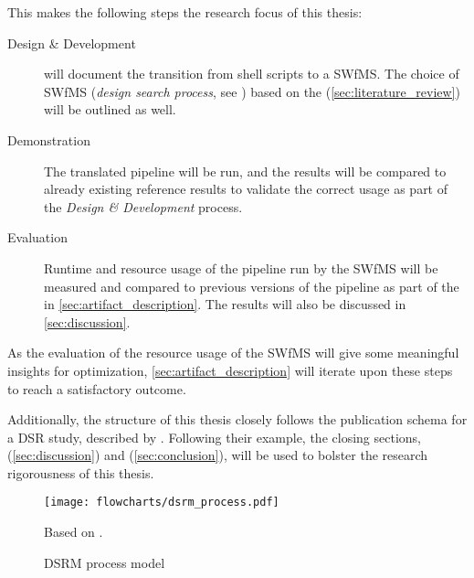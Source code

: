 This makes the following steps the research focus of this thesis:
\begin{description}
    \item[Design \& Development]  will document the transition from shell scripts to a \ac{SWfMS}. The choice of \ac{SWfMS} (\textit{design search process}, see \autocite{Gregor2013}) based on the  (\cref{sec:literature_review}) will be outlined as well.
    \item[Demonstration] The translated pipeline will be run, and the results will be compared to already existing reference results to validate the correct usage as part of the \textit{Design \& Development} process.
    \item[Evaluation] Runtime and resource usage of the pipeline run by the \ac{SWfMS} will be measured and compared to previous versions of the pipeline as part of the \lowercase{} in \cref{sec:artifact_description}. The results will also be discussed in \cref{sec:discussion}.
\end{description}
As the evaluation of the resource usage of the \ac{SWfMS} will give some meaningful insights for optimization, \cref{sec:artifact_description} will iterate upon these steps to reach a satisfactory outcome.

Additionally, the structure of this thesis closely follows the publication schema for a \ac{DSR} study, described by \citeauthor{Gregor2013} \autocite[Table 3]{Gregor2013}. Following their example, the closing sections,  (\cref{sec:discussion}) and  (\cref{sec:conclusion}), will be used to bolster the research rigorousness of this thesis.

\begin{figure}[H]
    \centering
	\texttt{[image: flowcharts/dsrm\_process.pdf]}
	\caption[\ac{DSRM} Process Model]{\ac{DSRM} process model}{Based on \autocite[Figure 1]{Peffers2007}.}
	\label{fig:dsrm_process}
\end{figure}
